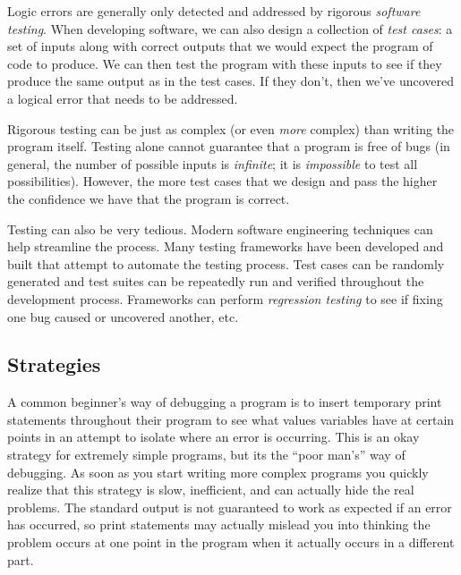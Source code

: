 Logic errors are generally only detected and addressed by rigorous 
 \emph{software testing}.  When developing 
software, we can also
design a collection of  \emph{test cases}: a set 
of inputs along with
correct outputs that we would expect the program of code to produce.
We can then test the program with these inputs to see if they produce
the same output as in the test cases.  If they don't, then we've uncovered
a logical error that needs to be addressed.

Rigorous testing can be just as complex (or even \emph{more} complex) 
than writing the program itself.  Testing alone cannot guarantee that a
program is free of bugs (in general, the number of possible inputs is
\emph{infinite}; it is \emph{impossible} to test all possibilities).  However, 
the more test cases that we design and pass the higher the confidence 
we have that the program is correct.

Testing can also be very tedious.  Modern software engineering techniques
can help streamline the process.  Many testing frameworks have been
developed and built that attempt to automate the testing process.  Test 
cases can be randomly generated and test suites can be repeatedly 
run and verified throughout the development process.  Frameworks
can perform  \emph{regression testing} to see if fixing one bug caused or uncovered another, etc.

\subsection{Strategies}

A common beginner's way of debugging a program is to insert 
temporary print statements throughout their program to see what
values variables have at certain points in an attempt to isolate where
an error is occurring.  This is an okay strategy for extremely simple
programs, but its the ``poor man's'' way of debugging.  As soon as
you start writing more complex programs you quickly realize that this
strategy is slow, inefficient, and can actually hide the real problems. 
The standard output is not guaranteed to work as expected if an error
has occurred, so print statements may actually mislead you into thinking
the problem occurs at one point in the program when it actually
occurs in a different part.


